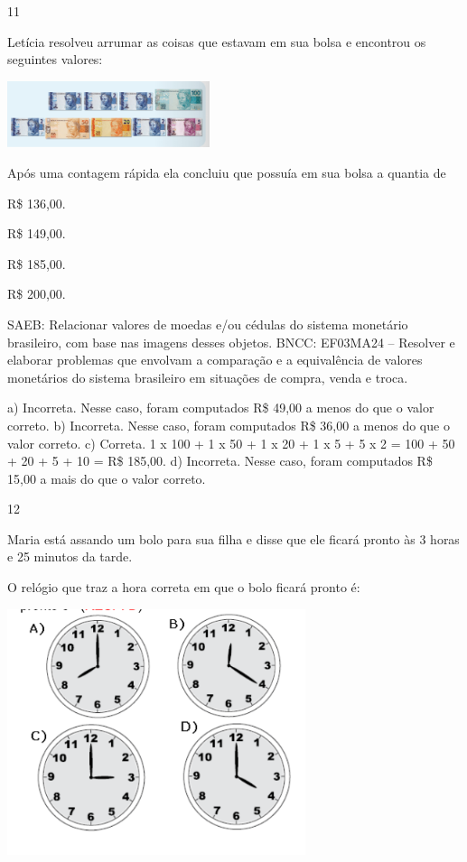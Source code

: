 \begin{multicols}{2}
\begin{enumerate}
{\num{11}

Letícia resolveu arrumar as coisas que estavam em sua bolsa e encontrou os seguintes valores:

\includegraphics[width=2.33354in,height=0.76673in]{media/image125.png}

Após uma contagem rápida ela concluiu que possuía em sua bolsa a quantia de

\begin{escolha}

\item
  R\$ 136,00.
\item
  R\$ 149,00.
\item
  R\$ 185,00.
\item
  R\$ 200,00.
\end{escolha}

SAEB: Relacionar valores de moedas e/ou cédulas do sistema monetário brasileiro, com base nas imagens desses objetos.
BNCC: EF03MA24 -- Resolver e elaborar problemas que envolvam a comparação e a equivalência de
valores monetários do sistema brasileiro em situações de compra, venda e troca.

a) Incorreta. Nesse caso, foram computados R\$ 49,00 a menos do que o valor correto.
b) Incorreta. Nesse caso, foram computados R\$ 36,00 a menos do que o valor correto.
c) Correta. 1 x 100 + 1 x 50 + 1 x 20 + 1 x 5 + 5 x 2 = 100 + 50 + 20 + 5 + 10 = R\$ 185,00.
d) Incorreta. Nesse caso, foram computados R\$ 15,00 a mais do que o valor correto.

\num{12}

Maria está assando um bolo para sua filha e disse que ele ficará pronto às 3 horas e 25 minutos da tarde.

O relógio que traz a hora correta em que o bolo ficará pronto é:


\includegraphics[width=3.44197in,height=2.84191in]{media/image126.png}

}
\end{enumerate}
\end{multicols}
